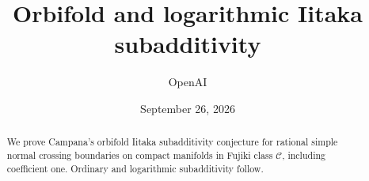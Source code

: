 \documentclass[11pt]{amsart}
\title[Orbifold and logarithmic Iitaka subadditivity]{Orbifold and logarithmic Iitaka subadditivity}
\author{OpenAI}
\date{September 26, 2026}
\theoremstyle{definition}
\theoremstyle{remark}
\numberwithin{equation}{section}
\begin{document}
\begin{abstract}
We prove Campana's orbifold Iitaka subadditivity conjecture for rational
simple normal crossing boundaries on compact manifolds in Fujiki class
$\mathcal C$, including coefficient one. Ordinary and logarithmic
subadditivity follow.
\end{abstract}
\maketitle
\tableofcontents








\appendix

\raggedbottom

\end{document}
